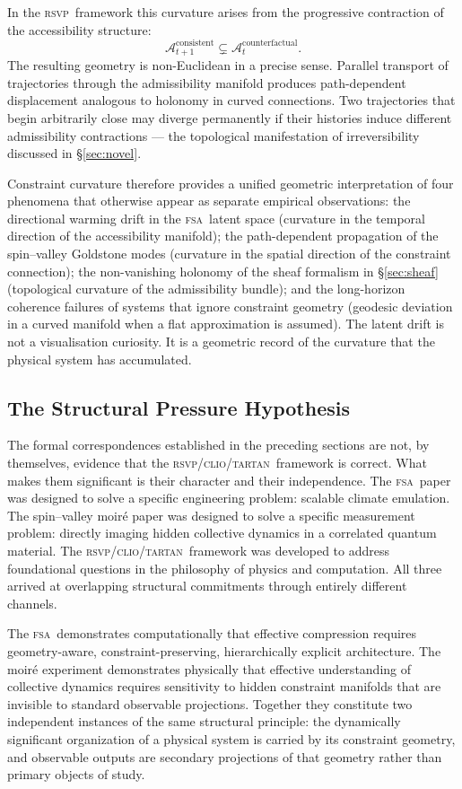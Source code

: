 \documentclass[11pt,a4paper]{article}
\theoremstyle{plain}
\theoremstyle{definition}
\theoremstyle{remark}
\newcommand{\A}{\mathcal{A}}
\newcommand{\RSVP}{\textup{\textsc{rsvp}}}
\newcommand{\CLIO}{\textup{\textsc{clio}}}
\newcommand{\TARTAN}{\textup{\textsc{tartan}}}
\newcommand{\FSA}{\textup{\textsc{fsa}}}
\begin{document}
In the \RSVP\ framework this curvature arises from the progressive
contraction of the accessibility structure:
\[
\A_{t+1}^{\mathrm{consistent}} \subsetneq \A_t^{\mathrm{counterfactual}}.
\]
The resulting geometry is non-Euclidean in a precise sense. Parallel
transport of trajectories through the admissibility manifold produces
path-dependent displacement analogous to holonomy in curved connections.
Two trajectories that begin arbitrarily close may diverge permanently if
their histories induce different admissibility contractions --- the
topological manifestation of irreversibility discussed in \S\ref{sec:novel}.

Constraint curvature therefore provides a unified geometric interpretation
of four phenomena that otherwise appear as separate empirical observations:
the directional warming drift in the \FSA\ latent space (curvature in the
temporal direction of the accessibility manifold); the path-dependent
propagation of the spin--valley Goldstone modes (curvature in the spatial
direction of the constraint connection); the non-vanishing holonomy of the
sheaf formalism in \S\ref{sec:sheaf} (topological curvature of the
admissibility bundle); and the long-horizon coherence failures of systems
that ignore constraint geometry (geodesic deviation in a curved manifold
when a flat approximation is assumed). The latent drift is not a
visualisation curiosity. It is a geometric record of the curvature that
the physical system has accumulated.

\subsection{The Structural Pressure Hypothesis}

The formal correspondences established in the preceding sections are not,
by themselves, evidence that the \RSVP/\CLIO/\TARTAN\ framework is correct.
What makes them significant is their character and their independence. The
\FSA\ paper was designed to solve a specific engineering problem: scalable
climate emulation. The spin--valley moiré paper was designed to solve a
specific measurement problem: directly imaging hidden collective dynamics in
a correlated quantum material. The \RSVP/\CLIO/\TARTAN\ framework was
developed to address foundational questions in the philosophy of physics and
computation. All three arrived at overlapping structural commitments through
entirely different channels.

The \FSA\ demonstrates computationally that effective compression requires
geometry-aware, constraint-preserving, hierarchically explicit architecture.
The moiré experiment demonstrates physically that effective understanding of
collective dynamics requires sensitivity to hidden constraint manifolds that
are invisible to standard observable projections. Together they constitute
two independent instances of the same structural principle: the
dynamically significant organization of a physical system is carried by its
constraint geometry, and observable outputs are secondary projections of
that geometry rather than primary objects of study.
\end{document}
